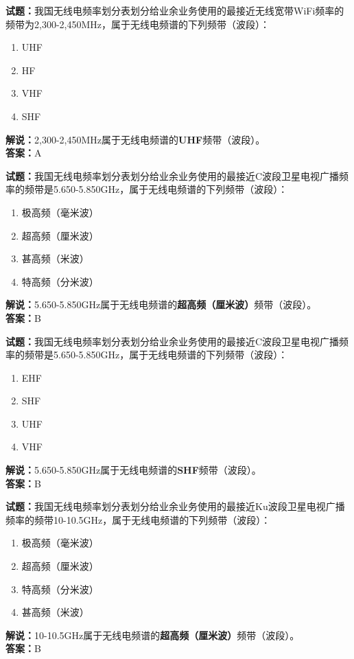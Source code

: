 \documentclass{ctexbook}
\begin{document}

\bigskip


\noindent\textbf{试题：}我国无线电频率划分表划分给业余业务使用的最接近无线宽带WiFi频率的频带为2,300-2,450MHz，属于无线电频谱的下列频带（波段）：
\begin{enumerate}[leftmargin=3em]
\item UHF
\item HF
\item VHF
\item SHF
\end{enumerate}
\noindent\textbf{解说：}2,300-2,450MHz属于无线电频谱的\textbf{UHF}频带（波段）。\\\noindent\textbf{答案：}A


\bigskip


\noindent\textbf{试题：}我国无线电频率划分表划分给业余业务使用的最接近C波段卫星电视广播频率的频带是5.650-5.850GHz，属于无线电频谱的下列频带（波段）：
\begin{enumerate}[leftmargin=3em]
\item 极高频（毫米波）
\item 超高频（厘米波）
\item 甚高频（米波）
\item 特高频（分米波）
\end{enumerate}
\noindent\textbf{解说：}5.650-5.850GHz属于无线电频谱的\textbf{超高频（厘米波）}频带（波段）。\\\noindent\textbf{答案：}B


\bigskip


\noindent\textbf{试题：}我国无线电频率划分表划分给业余业务使用的最接近C波段卫星电视广播频率的频带是5.650-5.850GHz，属于无线电频谱的下列频带（波段）：
\begin{enumerate}[leftmargin=3em]
\item EHF
\item SHF
\item UHF
\item VHF
\end{enumerate}
\noindent\textbf{解说：}5.650-5.850GHz属于无线电频谱的\textbf{SHF}频带（波段）。\\\noindent\textbf{答案：}B


\bigskip


\noindent\textbf{试题：}我国无线电频率划分表划分给业余业务使用的最接近Ku波段卫星电视广播频率的频带10-10.5GHz，属于无线电频谱的下列频带（波段）：
\begin{enumerate}[leftmargin=3em]
\item 极高频（毫米波）
\item 超高频（厘米波）
\item 特高频（分米波）
\item 甚高频（米波）
\end{enumerate}
\noindent\textbf{解说：}10-10.5GHz属于无线电频谱的\textbf{超高频（厘米波）}频带（波段）。\\\noindent\textbf{答案：}B
\end{document}
